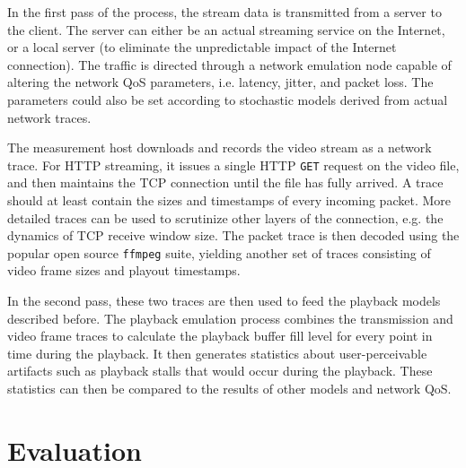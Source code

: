 In the first pass of the process, the stream data is transmitted from a server to the client. The server can either be an actual streaming service on the Internet, or a local server (to eliminate the unpredictable impact of the Internet connection). The traffic is directed through a network emulation node capable of altering the network QoS parameters, i.e. latency, jitter, and packet loss. The parameters could also be set according to stochastic models derived from actual network traces. 

The measurement host downloads and records the video stream as a network trace. For HTTP streaming, it issues a single HTTP \texttt{GET} request on the video file, and then maintains the TCP connection until the file has fully arrived. A trace should at least contain the sizes and timestamps of every incoming packet. More detailed traces can be used to scrutinize other layers of the connection, e.g. the dynamics of TCP receive window size. The packet trace is then decoded using the popular open source \texttt{ffmpeg} suite, yielding another set of traces consisting of video frame sizes and playout timestamps.

In the second pass, these two traces are then used to feed the playback models described before. The playback emulation process combines the transmission and video frame traces to calculate the playback buffer fill level for every point in time during the playback. It then generates statistics about user-perceivable artifacts such as playback stalls that would occur during the playback. These statistics can then be compared to the results of other models and network QoS.



\section{Evaluation}
\label{sec:evaluations}

